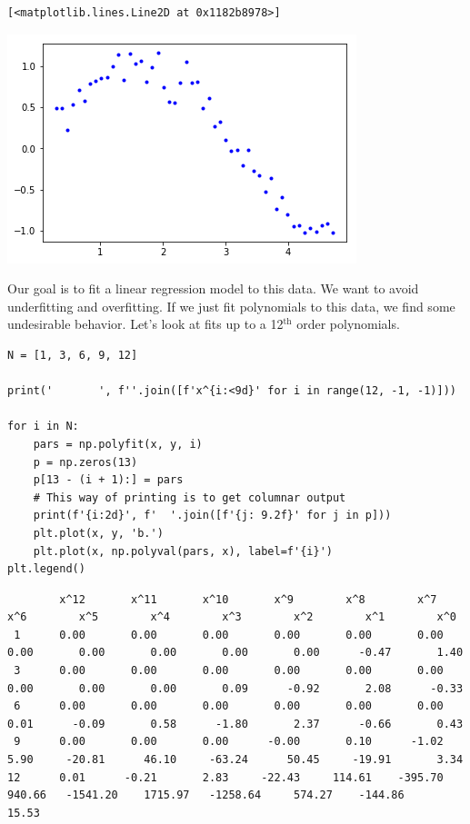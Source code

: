 \documentclass[11pt]{article}
\begin{document}
\begin{verbatim}
[<matplotlib.lines.Line2D at 0x1182b8978>]
\end{verbatim}



\begin{center}
\includegraphics[width=.9\linewidth]{obipy-resources/d00b1703e45a1bb2f86b06f32bba01b8-19673DSj.png}
\end{center}

Our goal is to fit a linear regression model to this data. We want to avoid underfitting and overfitting. If we just fit polynomials to this data, we find some undesirable behavior. Let's look at fits up to a 12\(^{\text{th}}\) order polynomials.

\begin{verbatim}
N = [1, 3, 6, 9, 12]

print('       ', f''.join([f'x^{i:<9d}' for i in range(12, -1, -1)]))

for i in N:
    pars = np.polyfit(x, y, i)
    p = np.zeros(13)
    p[13 - (i + 1):] = pars
    # This way of printing is to get columnar output
    print(f'{i:2d}', f'  '.join([f'{j: 9.2f}' for j in p]))
    plt.plot(x, y, 'b.')
    plt.plot(x, np.polyval(pars, x), label=f'{i}')
plt.legend()
\end{verbatim}

\begin{verbatim}
        x^12       x^11       x^10       x^9        x^8        x^7        x^6        x^5        x^4        x^3        x^2        x^1        x^0
 1      0.00       0.00       0.00       0.00       0.00       0.00       0.00       0.00       0.00       0.00       0.00      -0.47       1.40
 3      0.00       0.00       0.00       0.00       0.00       0.00       0.00       0.00       0.00       0.09      -0.92       2.08      -0.33
 6      0.00       0.00       0.00       0.00       0.00       0.00       0.01      -0.09       0.58      -1.80       2.37      -0.66       0.43
 9      0.00       0.00       0.00      -0.00       0.10      -1.02       5.90     -20.81      46.10     -63.24      50.45     -19.91       3.34
12      0.01      -0.21       2.83     -22.43     114.61    -395.70     940.66   -1541.20    1715.97   -1258.64     574.27    -144.86      15.53

\end{verbatim}
\end{document}
